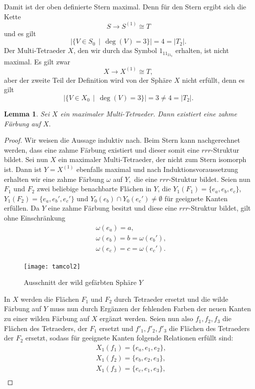 \documentclass[12pt,titlepage,twoside,cleardoublepage]{article}
\theoremstyle{nummermitklammern}
\newtheorem{lemma}[temp]{Lemma}
\newtheorem{lemma}[zahl]{Lemma}
\numberwithin{equation}{section}
\begin{document}
Damit ist der oben definierte Stern maximal. 
Denn für den Stern ergibt sich die Kette 
\[
S\to S^{(1)}\cong T
\]
und es gilt 
\[
\vert \{V\in S_0\,\mid \, \deg(V)=3\}\vert=4=\vert T_2\vert .
\]
Der Multi-Tetraeder $X$, den wir durch das Symbol $1_11_21_3$ erhalten, ist nicht maximal. Es gilt zwar
\[
X\to X^{(1)}\cong T,
\] 
aber der zweite Teil der Definition wird von der Sphäre $X$ nicht erfüllt, denn es gilt
\[
\vert \{V\in X_0\,\mid \, \deg(V)=3\}\vert=3\neq 4=\vert T_2\vert.
\]
\begin{lemma}\label{max}
Sei $X$ ein maximaler Multi-Tetraeder. Dann existiert eine zahme Färbung auf $X.$
\end{lemma}
\begin{proof}
Wir weisen die Aussage induktiv nach. Beim Stern kann nachgerechnet werden, dass eine zahme Färbung existiert und dieser somit eine $rrr$-Struktur bildet. Sei nun $X$ ein maximaler Multi-Tetraeder, der nicht zum Stern isomorph ist.
 Dann ist $Y=X^{(1)}$ ebenfalls maximal und nach Induktionsvoraussetzung erhalten wir eine zahme Färbung $\omega$ auf $Y,$ die eine $rrr$-Struktur bildet. Seien nun $F_1$ und $F_2$ zwei beliebige benachbarte Flächen in $Y$, die $Y_1(F_1)=\{e_a,e_b,e_c\}$, $Y_1(F_2)=\{e_a,e_b',e_c'\}$ und $Y_0(e_b)\cap Y_0(e_c')\neq \emptyset$ für geeignete Kanten erfüllen.
Da $Y$ eine zahme Färbung besitzt und diese eine $rrr$-Struktur bildet, gilt ohne Einschränkung
\begin{align*}
&\omega(e_a)=a,\\
&\omega(e_b)=b=\omega(e_b'),\\
&\omega(e_c)=c=\omega(e_c').
\end{align*}
\begin{figure}[H]
\begin{center}
\texttt{[image: tamcol2]}
\end{center}
\caption{Ausschnitt der wild gefärbten Sphäre $Y$}
\end{figure}
In $X$ werden die Flächen $F_1$ und $F_2$ durch Tetraeder ersetzt und die wilde Färbung auf $Y$ muss nun durch Ergänzen der fehlenden Farben der neuen Kanten zu einer wilden Färbung auf $X$ ergänzt werden. Seien nun also $f_1,f_2,f_3$ die Flächen des Tetraeders, der $F_1$ ersetzt und $f'_1,f'_2,f'_3$ die Flächen des Tetraeders der $F_2$ ersetzt, sodass für geeignete Kanten folgende Relationen erfüllt sind:
\begin{align*}
&X_1(f_1)=\{e_a,e_1,e_2\},\\
&X_1(f_2)=\{e_b,e_2,e_3\},\\
&X_1(f_3)=\{e_c,e_1,e_3\},\\

\end{align*}
\end{proof}
\end{document}
